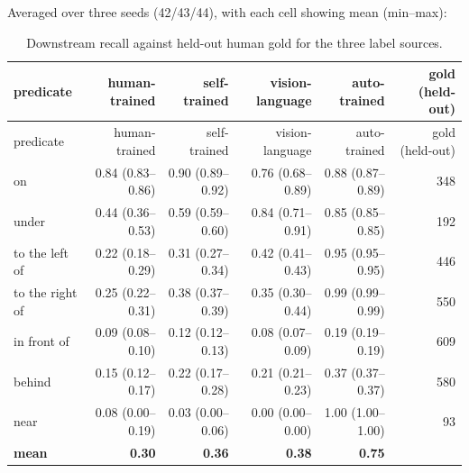 Averaged over three seeds (42/43/44), with each cell showing mean (min--max):

\begin{center}
\setlength{\tabcolsep}{3pt}
\scriptsize
\begin{longtable}{lrrrrr}
\caption[Downstream recall against held-out human gold]{Downstream recall against held-out human gold for the three label sources.}\\
\hline
predicate & human-trained & self-trained & vision-language & auto-trained & gold (held-out) \\
\hline
\endfirsthead
\hline
predicate & human-trained & self-trained & vision-language & auto-trained & gold (held-out) \\
\hline
\endhead
on & 0.84 (0.83--0.86) & 0.90 (0.89--0.92) & 0.76 (0.68--0.89) & 0.88 (0.87--0.89) & 348 \\
under & 0.44 (0.36--0.53) & 0.59 (0.59--0.60) & 0.84 (0.71--0.91) & 0.85 (0.85--0.85) & 192 \\
to the left of & 0.22 (0.18--0.29) & 0.31 (0.27--0.34) & 0.42 (0.41--0.43) & 0.95 (0.95--0.95) & 446 \\
to the right of & 0.25 (0.22--0.31) & 0.38 (0.37--0.39) & 0.35 (0.30--0.44) & 0.99 (0.99--0.99) & 550 \\
in front of & 0.09 (0.08--0.10) & 0.12 (0.12--0.13) & 0.08 (0.07--0.09) & 0.19 (0.19--0.19) & 609 \\
behind & 0.15 (0.12--0.17) & 0.22 (0.17--0.28) & 0.21 (0.21--0.23) & 0.37 (0.37--0.37) & 580 \\
near & 0.08 (0.00--0.19) & 0.03 (0.00--0.06) & 0.00 (0.00--0.00) & 1.00 (1.00--1.00) & 93 \\
\textbf{mean} & \textbf{0.30} & \textbf{0.36} & \textbf{0.38} & \textbf{0.75} &  \\
\hline
\end{longtable}
\end{center}

